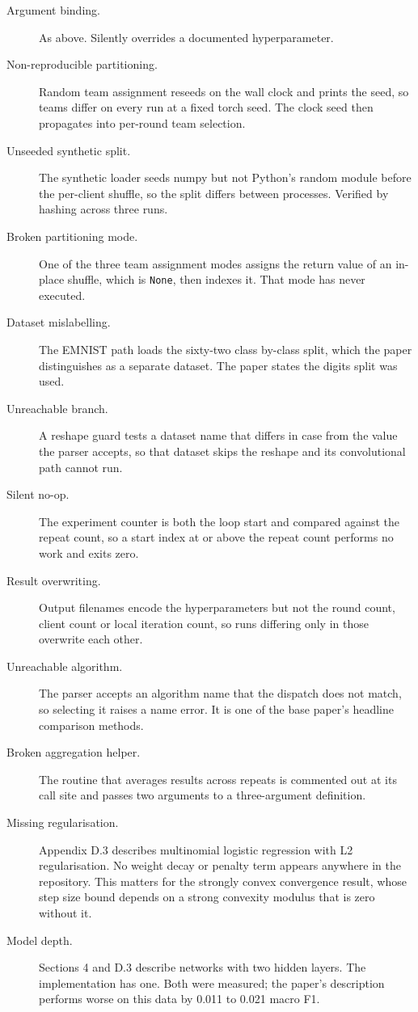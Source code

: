 \begin{description}
  \item[Argument binding.] As above. Silently overrides a documented
    hyperparameter.
  \item[Non-reproducible partitioning.] Random team assignment reseeds on the
    wall clock and prints the seed, so teams differ on every run at a fixed
    torch seed. The clock seed then propagates into per-round team selection.
  \item[Unseeded synthetic split.] The synthetic loader seeds numpy but not
    Python's random module before the per-client shuffle, so the split differs
    between processes. Verified by hashing across three runs.
  \item[Broken partitioning mode.] One of the three team assignment modes
    assigns the return value of an in-place shuffle, which is \texttt{None},
    then indexes it. That mode has never executed.
  \item[Dataset mislabelling.] The EMNIST path loads the sixty-two class
    by-class split, which the paper distinguishes as a separate dataset. The
    paper states the digits split was used.
  \item[Unreachable branch.] A reshape guard tests a dataset name that differs
    in case from the value the parser accepts, so that dataset skips the
    reshape and its convolutional path cannot run.
  \item[Silent no-op.] The experiment counter is both the loop start and
    compared against the repeat count, so a start index at or above the repeat
    count performs no work and exits zero.
  \item[Result overwriting.] Output filenames encode the hyperparameters but
    not the round count, client count or local iteration count, so runs
    differing only in those overwrite each other.
  \item[Unreachable algorithm.] The parser accepts an algorithm name that the
    dispatch does not match, so selecting it raises a name error. It is one of
    the base paper's headline comparison methods.
  \item[Broken aggregation helper.] The routine that averages results across
    repeats is commented out at its call site and passes two arguments to a
    three-argument definition.
  \item[Missing regularisation.] Appendix D.3 describes multinomial logistic
    regression with L2 regularisation. No weight decay or penalty term appears
    anywhere in the repository. This matters for the strongly convex
    convergence result, whose step size bound depends on a strong convexity
    modulus that is zero without it.
  \item[Model depth.] Sections 4 and D.3 describe networks with two hidden
    layers. The implementation has one. Both were measured; the paper's
    description performs worse on this data by 0.011 to 0.021 macro F1.
\end{description}
